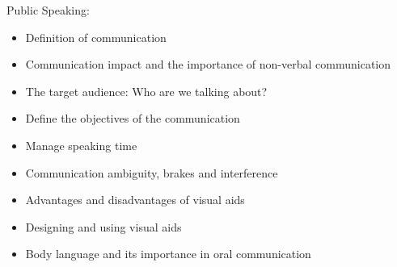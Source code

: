 Public Speaking:
\begin{itemize}
    \item Definition of communication
    \item Communication impact and the importance of non-verbal communication
    \item The target audience: Who are we talking about?
    \item Define the objectives of the communication
    \item Manage speaking time
    \item Communication ambiguity, brakes and interference
    \item Advantages and disadvantages of visual aids
    \item Designing and using visual aids
    \item Body language and its importance in oral communication
\end{itemize}